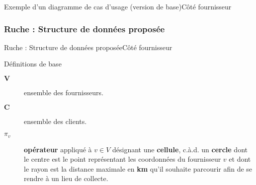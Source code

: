 \documentclass[usenames,dvipsnames]{beamer}
\begin{document}
\begin{frame}{Exemple d'un diagramme de cas d'usage (version de base)}{Côté fournisseur}
\begin{figure}[!ht]
  \centering
\end{figure}
\end{frame}

\subsubsection*{Ruche : Structure de données proposée}
\begin{frame}{Ruche : Structure de données proposée}{Côté fournisseur}
\begin{block}{Définitions de base}
\begin{description}
  \item[$\textbf{V}$]{ensemble des fournisseurs.}
  \item[$\textbf{C}$]{ensemble des clients.}
  \item[$\pi_v$]{\textbf{opérateur} appliqué à $v \in V$ désignant une \textbf{cellule}, c.à.d. un \textbf{cercle} dont le centre est le point représentant les coordonnées du fournisseur $v$ et dont le rayon est la distance maximale en \textbf{km} qu'il souhaite parcourir afin de se rendre à un lieu de collecte.}
\end{description}
\end{block}
\end{frame}
\end{document}
